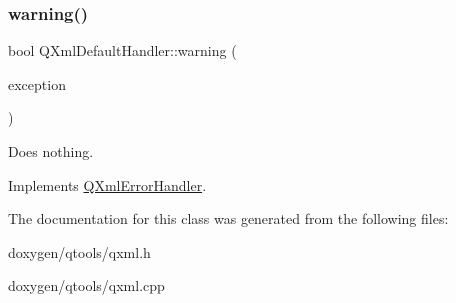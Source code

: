 \subsubsection{\texorpdfstring{warning()}{warning()}}
{\footnotesize\ttfamily bool Q\+Xml\+Default\+Handler\+::warning (\begin{DoxyParamCaption}\item[{const \mbox{\hyperlink{class_q_xml_parse_exception}{Q\+Xml\+Parse\+Exception}} \&}]{exception }\end{DoxyParamCaption})\hspace{0.3cm}{\ttfamily [virtual]}}

Does nothing. 

Implements \mbox{\hyperlink{class_q_xml_error_handler_a79ae0cce3316a76b7777c6e90b101afe}{Q\+Xml\+Error\+Handler}}.



The documentation for this class was generated from the following files\+:\begin{DoxyCompactItemize}
\item 
doxygen/qtools/qxml.\+h\item 
doxygen/qtools/qxml.\+cpp\end{DoxyCompactItemize}
